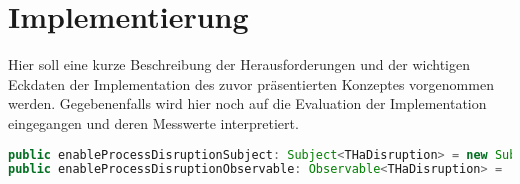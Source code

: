 \section{Implementierung}\label{chap:implementierung}
Hier soll eine kurze Beschreibung der Herausforderungen und der wichtigen
Eckdaten der Implementation des zuvor präsentierten Konzeptes vorgenommen
werden. Gegebenenfalls wird hier noch auf die Evaluation der Implementation
eingegangen und deren Messwerte interpretiert.

\begin{lstlisting}[language=java, numbers=none, caption=Exemplarisches Beobachter-Muster]
public enableProcessDisruptionSubject: Subject<THaDisruption> = new Subject();  
public enableProcessDisruptionObservable: Observable<THaDisruption> = 		  this.enableProcessDisruptionSubject.asObservable(); 
\end{lstlisting}

\cleardoublepage

\begin{comment}
\section{Projektplanung}\label{chap:projektplanung}

\subsection{Projektstrukturplan}\label{sec:strukturplan}
Hier steht, was in den restlichen Kapiteln behandelt wird. Die Einleitung endet mit diesem Abschnitt.

\subsection{Projektzeitplan}\label{sec:zeitplan}
Hier steht, was in den restlichen Kapiteln behandelt wird. Die Einleitung endet mit diesem Abschnitt.

\subsection{Risikomanagement}\label{sec:risikomgmt}
Hier steht, was in den restlichen Kapiteln behandelt wird. Die Einleitung endet mit diesem Abschnitt.
\end{comment}



